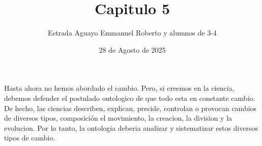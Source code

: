 \documentclass{article}
\title{Capitulo 5}
\author{Estrada Aguayo Emmanuel Roberto y alumnos de 3-4}
\date{28 de Agosto de 2025 }
\begin{document}
\sloppy
\maketitle
\begin{justifying}
    \noindent Hasta ahora no hemos abordado el cambio. Pero, si creemos en la ciencia,
    debemos defender el postulado ontologico de que todo esta en constante cambio. De hecho, 
    las ciencias describen, explican, precide, controlan o provocan cambios de diversos tipos, composición
    el movimiento, la creacion, la division y la evolucion. Por lo tanto, la ontologia deberia analizar y 
    sistematizar estos diversos tipos de cambio.
\end{justifying}



\printbibliography
\end{document}
